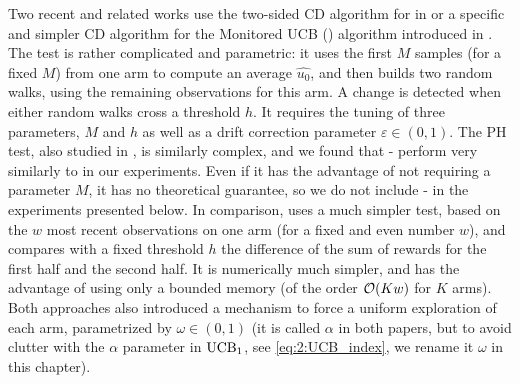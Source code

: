 Two recent and related works use
the two-sided \CUSUM{} CD algorithm for \CUSUMUCB{} in \cite{LiuLeeShroff17}
or a specific and simpler CD algorithm for the Monitored UCB (\MUCB) algorithm introduced in \cite{CaoZhenKvetonXie18}.
%
The \CUSUM{} test is rather complicated and parametric: it uses the first $M$ samples (for a fixed $M$) from one arm to compute an average $\hat{u_0}$, and then builds two random walks, using the remaining observations for this arm. A change is detected when either random walks cross a threshold $h$.
It requires the tuning of three parameters, $M$ and $h$ as well as a drift correction parameter $\varepsilon\in(0,1)$.
The PH test, also studied in \cite{LiuLeeShroff17}, is similarly complex,
and we found that \PHT-\UCB{} perform very similarly to \CUSUMUCB{} in our experiments.
Even if it has the advantage of not requiring a parameter $M$,
it has no theoretical guarantee, so we do not include \PHT-\UCB{} in the experiments presented below.
%
In comparison, \MUCB{} uses a much simpler test, based on the $w$ most recent observations on one arm (for a fixed and even number $w$), and compares with a fixed threshold $h$ the difference of the sum of rewards for the first half and the second half. It is numerically much simpler, and has the advantage of using only a bounded memory (of the order $\mathop{}\mathopen{}\mathcal{O}\mathopen{}\left(K w\right)$ for $K$ arms).
%
Both approaches also introduced a mechanism to force a uniform exploration of each arm, parametrized by $\omega\in(0,1)$ (it is called $\alpha$ in both papers, but to avoid clutter with the $\alpha$ parameter in $\mathrm{UCB}_1$, see \eqref{eq:2:UCB_index}, we rename it $\omega$ in this chapter).

